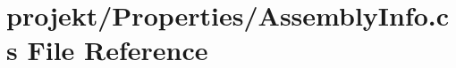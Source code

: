 \section{projekt/\+Properties/\+Assembly\+Info.cs File Reference}
\label{projekt_2Properties_2AssemblyInfo_8cs}
